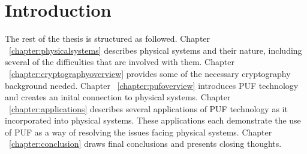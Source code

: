 %
%
%

\chapter{Introduction}
\label{chapter:intro}

The rest of the thesis is structured as followed. Chapter ~\ref{chapter:physicalsystems} describes physical systems and
their nature, including several of the difficulties that are involved with them. Chapter ~\ref{chapter:cryptographyoverview}
provides some of the necessary cryptography background needed. Chapter ~\ref{chapter:pufoverview} introduces
PUF technology and creates an inital connection to physical systems. Chapter ~\ref{chapter:applications} describes several
applications of PUF technology as it incorporated into physical systems. These applications each demonstrate the use of PUF
as a way of resolving the issues facing physical systems. Chapter ~\ref{chapter:conclusion} draws final conclusions and presents
closing thoughts.

